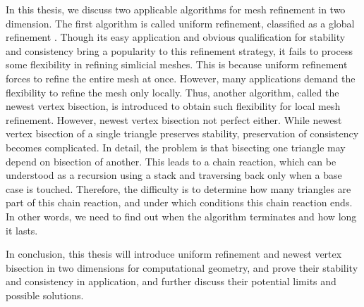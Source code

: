 In this thesis, we discuss two applicable algorithms for mesh refinement in two dimension. The first algorithm is called uniform refinement, classified as a global refinement \cite{bank1983some,bey2000simplicial,Bey1995}. Though its easy application and obvious qualification for stability and consistency bring a popularity to this refinement strategy, it fails to process some flexibility in refining simlicial meshes. This is because uniform refinement forces to refine the entire mesh at once. However, many applications demand the flexibility to refine the mesh only locally. Thus, another algorithm, called the newest vertex bisection, is introduced to obtain such flexibility for local mesh refinement. However, newest vertex bisection not perfect either. While newest vertex bisection of a single triangle preserves stability, preservation of consistency becomes complicated. In detail, the problem is that bisecting one triangle may depend on bisection of another. This leads to a chain reaction, which can be understood as a recursion using a stack and traversing back only when a base case is touched. Therefore, the difficulty is to determine how many triangles are part of this chain reaction, and under which conditions this chain reaction ends. In other words, we need to find out when the algorithm terminates and how long it lasts. 

In conclusion, this thesis will introduce uniform refinement and newest vertex bisection in two dimensions for computational geometry, and prove their stability and consistency in application, and further discuss their potential limits and possible solutions.